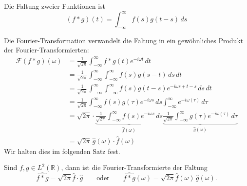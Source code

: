 \begin{definition}
\label{definition:faltung}
Die Faltung zweier Funktionen ist
\begin{equation}
(f*g)(t)
=
\int_{-\infty}^\infty f(s)g(t-s)\,ds
\label{definition:formel:faltung}
\end{equation}
\end{definition}
Die Fourier-Transformation verwandelt die Faltung in ein gewöhnliches
Produkt der Fourier-Transformierten:
\begin{align*}
\mathcal{F}(f*g)(\omega)
&=
\frac{1}{\sqrt{2\pi}}
\int_{-\infty}^\infty
f*g(t)
e^{-i\omega t}
\,dt
\\
&=
\frac{1}{\sqrt{2\pi}}
\int_{-\infty}^\infty
\int_{-\infty}^\infty
f(s) g(s-t)
\,ds
\,dt
\\
&=
\frac{1}{\sqrt{2\pi}}
\int_{-\infty}^\infty
\int_{-\infty}^\infty
f(s) g(t-s)
e^{-i\omega s+t-s}
\,ds
\,dt
\\
&=
\frac{1}{\sqrt{2\pi}}
\int_{-\infty}^\infty
f(s) g(\tau)
e^{-i\omega s}
\,ds
\int_{-\infty}^\infty
e^{-i\omega (\tau)}
\,d\tau
\\
&=
\sqrt{2\pi}
\cdot
\underbrace{
\frac{1}{\sqrt{2\pi}}
\int_{-\infty}^\infty
f(s)
e^{-i\omega s}
\,ds}_{\displaystyle \hat{f}(\omega)}
\underbrace{
\frac{1}{\sqrt{2\pi}}
\int_{-\infty}^\infty
g(\tau)
e^{-i\omega (\tau)}
\,d\tau}_{\displaystyle \hat{g}(\omega)}
\\
&=
\sqrt{2\pi}\,
\hat{g}(\omega)\cdot \hat{f}(\omega)
\end{align*}
Wir halten dies im folgenden Satz fest.

\begin{satz}[Faltungsformel]
\label{satz:faltungsformel}
Sind $f,g\in L^2(\mathbb R)$, dann ist die Fourier-Transformierte
der Faltung
\begin{equation}
\widehat{f*g}
=
\sqrt{2\pi}
\hat{f}\cdot \hat{g}
\qquad\text{oder}\qquad
\widehat{f*g}(\omega)
=
\sqrt{2\pi}
\hat{f}(\omega)\, \hat{g}(\omega).
\label{ft:faltungsformel}
\end{equation}
\end{satz}

